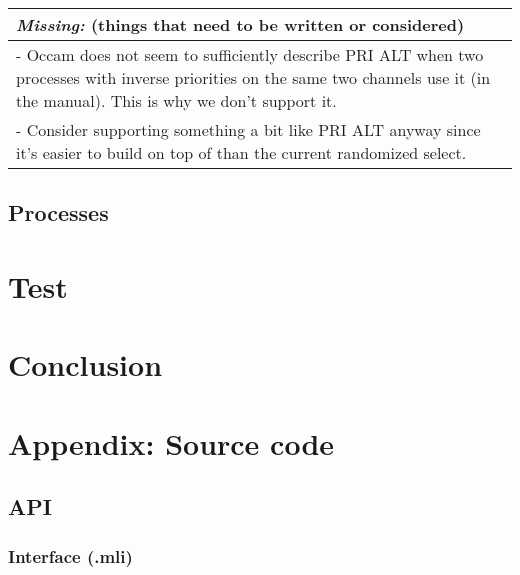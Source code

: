 \documentclass[a4paper,12pt]{article}
\newcommand{\missing}[1]{
\begin{tabular}{|p{11cm}|}
\hline
\emph{Missing:} {\scriptsize (things that need to be written or considered)} \\
\hline
#1
\hline
\end{tabular}
}
\begin{document}
\missing{
- Occam does not seem to sufficiently describe PRI ALT when two processes with inverse priorities
on the same two channels use it (in the manual). This is why we don't support it. \\
- Consider supporting something a bit like PRI ALT anyway since it's easier to build on top of
than the current randomized select. \\
}

\subsection{Processes}

\section{Test}

\section{Conclusion}

\appendix
\newpage
\section{Appendix: Source code}
\label{appendixSrc}

\scriptsize
\subsection{API}
\label{appendixAPI}
\subsubsection{Interface (.mli)}

\end{document}

